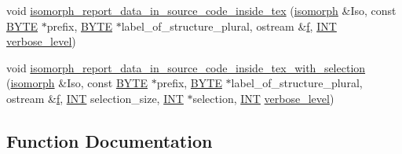 \begin{DoxyCompactItemize}
\item 
void \mbox{\hyperlink{isomorph__global_8_c_abe3bbbcc72eeed292e953c313dbdb314}{isomorph\+\_\+report\+\_\+data\+\_\+in\+\_\+source\+\_\+code\+\_\+inside\+\_\+tex}} (\mbox{\hyperlink{classisomorph}{isomorph}} \&Iso, const \mbox{\hyperlink{galois_8h_ab6cc7b4aeb6ea31aba2b3fbfc83ff5e6}{B\+Y\+TE}} $\ast$prefix, \mbox{\hyperlink{galois_8h_ab6cc7b4aeb6ea31aba2b3fbfc83ff5e6}{B\+Y\+TE}} $\ast$label\+\_\+of\+\_\+structure\+\_\+plural, ostream \&\mbox{\hyperlink{alphabet2_8_c_a362077c979b0bb65159c603270e40f70}{f}}, \mbox{\hyperlink{galois_8h_a09fddde158a3a20bd2dcadb609de11dc}{I\+NT}} \mbox{\hyperlink{simeon_8_c_a818073fbcc2f439e7c56952f67386122}{verbose\+\_\+level}})
\item 
void \mbox{\hyperlink{isomorph__global_8_c_a70fc252cacf037d9d20b1455671cd1d0}{isomorph\+\_\+report\+\_\+data\+\_\+in\+\_\+source\+\_\+code\+\_\+inside\+\_\+tex\+\_\+with\+\_\+selection}} (\mbox{\hyperlink{classisomorph}{isomorph}} \&Iso, const \mbox{\hyperlink{galois_8h_ab6cc7b4aeb6ea31aba2b3fbfc83ff5e6}{B\+Y\+TE}} $\ast$prefix, \mbox{\hyperlink{galois_8h_ab6cc7b4aeb6ea31aba2b3fbfc83ff5e6}{B\+Y\+TE}} $\ast$label\+\_\+of\+\_\+structure\+\_\+plural, ostream \&\mbox{\hyperlink{alphabet2_8_c_a362077c979b0bb65159c603270e40f70}{f}}, \mbox{\hyperlink{galois_8h_a09fddde158a3a20bd2dcadb609de11dc}{I\+NT}} selection\+\_\+size, \mbox{\hyperlink{galois_8h_a09fddde158a3a20bd2dcadb609de11dc}{I\+NT}} $\ast$selection, \mbox{\hyperlink{galois_8h_a09fddde158a3a20bd2dcadb609de11dc}{I\+NT}} \mbox{\hyperlink{simeon_8_c_a818073fbcc2f439e7c56952f67386122}{verbose\+\_\+level}})
\end{DoxyCompactItemize}


\subsection{Function Documentation}
\mbox{\label{isomorph__global_8_c_a12eb18567e79a7978cb4f9e80d2055ac}} 
